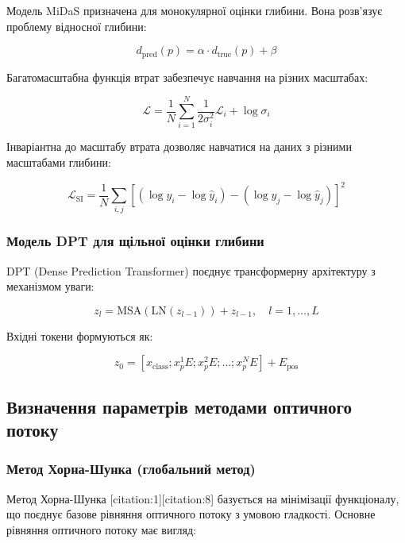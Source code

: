 \documentclass[14pt, a4paper]{extarticle}
\numberwithin{equation}{section}
\begin{document}
Модель MiDaS призначена для монокулярної оцінки глибини. Вона розв'язує проблему відносної глибини:

\begin{equation}
d_{\text{pred}}(p) = \alpha \cdot d_{\text{true}}(p) + \beta \tag{12}
\end{equation}

Багатомасштабна функція втрат забезпечує навчання на різних масштабах:

\begin{equation}
\mathcal{L} = \frac{1}{N} \sum_{i=1}^N \frac{1}{2\sigma_i^2} \mathcal{L}_i + \log \sigma_i \tag{13}
\end{equation}

Інваріантна до масштабу втрата дозволяє навчатися на даних з різними масштабами глибини:

\begin{equation}
\boxed{\mathcal{L}_{\text{SI}} = \frac{1}{N} \sum_{i,j} \left[ (\log y_i - \log \hat{y}_i) - (\log y_j - \log \hat{y}_j) \right]^2} \tag{14}
\end{equation}

\subsubsection{Модель DPT для щільної оцінки глибини}

DPT (Dense Prediction Transformer) поєднує трансформерну архітектуру з механізмом уваги:

\begin{equation}
z_l = \text{MSA}(\text{LN}(z_{l-1})) + z_{l-1}, \quad l=1,\ldots,L \tag{15}
\end{equation}

Вхідні токени формуються як:

\begin{equation}
z_0 = [x_{\text{class}}; x_p^1 E; x_p^2 E; \ldots; x_p^N E] + E_{\text{pos}} \tag{16}
\end{equation}

\subsection{Визначення параметрів методами оптичного потоку}

\subsubsection{Метод Хорна-Шунка (глобальний метод)}

Метод Хорна-Шунка [citation:1][citation:8] базується на мінімізації функціоналу, що поєднує базове рівняння оптичного потоку з умовою гладкості. Основне рівняння оптичного потоку має вигляд:
\end{document}
